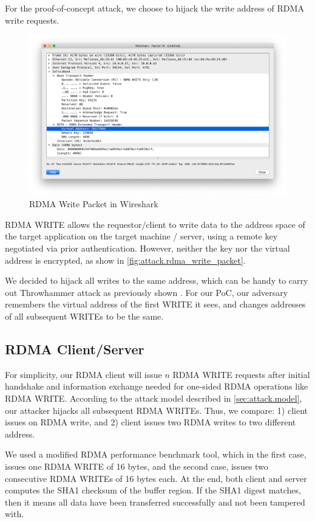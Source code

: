 For the proof-of-concept attack, we choose to hijack the write address of RDMA write requests.

\begin{figure}[h]
    \centering
    \includegraphics[width=0.5\textwidth - 5pt]{fig/rdma_write_packet_wireshark}
    \caption{RDMA Write Packet in Wireshark}
    \label{fig:attack.rdma_write_packet}
\end{figure}

RDMA WRITE allows the requestor/client to write data to the address space of the target application
on the target machine / server, using a remote key negotiated via prior authentication. However,
neither the key nor the virtual address is encrypted, as show in \autoref{fig:attack.rdma_write_packet}.

We decided to hijack all writes to the same address, which can be handy to carry out Throwhammer attack
as previously shown \cite{216055}.
For our PoC, our adversary remembers the virtual address of the first WRITE it sees,
and changes addresses of all subsequent WRITEs to be the same.

\subsection{RDMA Client/Server}
\label{sec:attack.rdma_app}

For simplicity, our RDMA client will issue $n$ RDMA WRITE requests after initial handshake and
information exchange needed for one-sided RDMA operations like RDMA WRITE. According to the attack model
described in \autoref{sec:attack.model}, our attacker hijacks all subsequent RDMA WRITEs. Thus, we compare:
1) client issues on RDMA write, and 2) client issues two RDMA writes to two different address.

We used a modified RDMA performance benchmark tool, which in the first case, issues one RDMA WRITE of 16 bytes,
and the second case, issues two consecutive RDMA WRITEs of 16 bytes each. At the end, both client and server
computes the SHA1 checksum of the buffer region. If the SHA1 digest matches, then it means all data have been
transferred successfully and not been tampered with.

